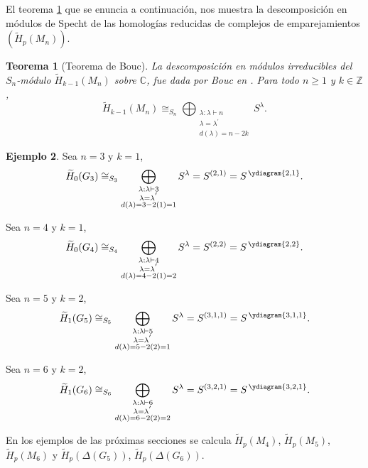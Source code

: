 \documentclass[12pt]{book}
\newtheorem{theorem}{Teorema}[section]
\theoremstyle{definition}
\newtheorem{example}[theorem]{Ejemplo}
\newcounter{in}
\begin{document}
El teorema \ref{bouc} que se enuncia a continuación, nos muestra la descomposición en módulos de
Specht de las homologías reducidas de complejos de emparejamientos $(\widetilde H_{p}(M_{n}))$. 

\begin{theorem}[Teorema de Bouc]
La descomposición en módulos irreducibles del $S_{n}$-módulo $\widetilde
H_{k-1}(M_{n})$ sobre $\mathbb{C}$, fue dada por Bouc en \cite{MR756517}. Para
todo $n\geq1$ y $k\in \mathbb{Z}$,
\begin{equation*}
  \widetilde H_{k-1}(M_{n})\cong_{S_{n}}\bigoplus_{\substack{\lambda:\lambda\vdash n\\
      \lambda=\lambda^{'}\\d(\lambda)=n-2k}} S^{\lambda}.
\end{equation*}
\label{bouc}
\end{theorem}

\begin{example}
  \quad

  Sea $n=3$ y $k=1$, 
  \begin{equation*}
    \widetilde H_{0}(G_{3})\cong_{S_{3}}\bigoplus_{\substack{\lambda:\lambda\vdash 3\\
        \lambda=\lambda^{'}\\d(\lambda)=3-2(1)=1}} S^{\lambda}=S^{(2,1)}=S^{\,\ydiagram{2,1}}.
  \end{equation*}
          
  Sea $n=4$ y $k=1$,
  \begin{equation*}
    \widetilde H_{0}(G_{4})\cong_{S_{4}}\bigoplus_{\substack{\lambda:\lambda\vdash 4\\
        \lambda=\lambda^{'}\\d(\lambda)=4-2(1)=2}} S^{\lambda}=S^{(2,2)}=S^{\,\ydiagram{2,2}}.
  \end{equation*}

  Sea $n=5$ y $k=2$,
  \begin{equation*}
    \widetilde H_{1}(G_{5})\cong_{S_{5}}\bigoplus_{\substack{\lambda:\lambda\vdash 5\\
        \lambda=\lambda^{'}\\d(\lambda)=5-2(2)=1}} S^{\lambda}=S^{(3,1,1)}=S^{\,\ydiagram{3,1,1}}.
  \end{equation*}
        
  Sea $n=6$ y $k=2$,
  \begin{equation*}
    \widetilde H_{1}(G_{6})\cong_{S_{6}}\bigoplus_{\substack{\lambda:\lambda\vdash 6\\
        \lambda=\lambda^{'}\\d(\lambda)=6-2(2)=2}} S^{\lambda}=S^{(3,2,1)}=S^{\,\ydiagram{3,2,1}}.
  \end{equation*}
\end{example}
En los ejemplos de las próximas secciones se calcula $\widetilde
H_{p}(M_{4})$, $\widetilde H_{p}(M_{5})$, $\widetilde H_{p}(M_{6})$ y
$\widetilde H_{p}(\Delta(G_{5}))$, $\widetilde H_{p}(\Delta(G_{6}))$.
\end{document}
